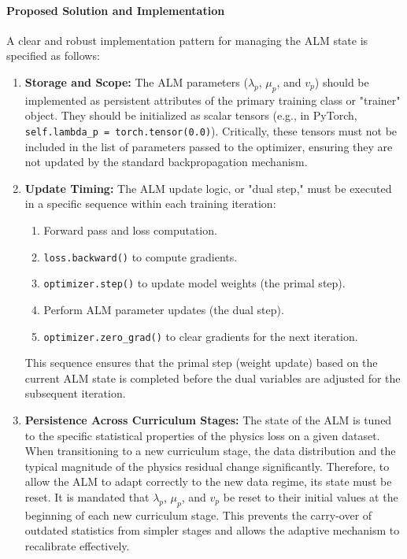 \documentclass[11pt, a4paper]{article}
\begin{document}
\paragraph{Proposed Solution and Implementation}
A clear and robust implementation pattern for managing the ALM state is specified as follows:
\begin{enumerate}
    \item \textbf{Storage and Scope:} The ALM parameters ($\lambda_p$, $\mu_p$, and $v_p$) should be implemented as persistent attributes of the primary training class or "trainer" object. They should be initialized as scalar tensors (e.g., in PyTorch, \texttt{self.lambda\_p = torch.tensor(0.0)}). Critically, these tensors must not be included in the list of parameters passed to the optimizer, ensuring they are not updated by the standard backpropagation mechanism.
    \item \textbf{Update Timing:} The ALM update logic, or "dual step," must be executed in a specific sequence within each training iteration:
    \begin{enumerate}
        \item Forward pass and loss computation.
        \item \texttt{loss.backward()} to compute gradients.
        \item \texttt{optimizer.step()} to update model weights (the primal step).
        \item Perform ALM parameter updates (the dual step).
        \item \texttt{optimizer.zero\_grad()} to clear gradients for the next iteration.
    \end{enumerate}
    This sequence ensures that the primal step (weight update) based on the current ALM state is completed before the dual variables are adjusted for the subsequent iteration.
    \item \textbf{Persistence Across Curriculum Stages:} The state of the ALM is tuned to the specific statistical properties of the physics loss on a given dataset. When transitioning to a new curriculum stage, the data distribution and the typical magnitude of the physics residual change significantly. Therefore, to allow the ALM to adapt correctly to the new data regime, its state must be reset. It is mandated that $\lambda_p$, $\mu_p$, and $v_p$ be reset to their initial values at the beginning of each new curriculum stage. This prevents the carry-over of outdated statistics from simpler stages and allows the adaptive mechanism to recalibrate effectively.
\end{enumerate}
\end{document}
